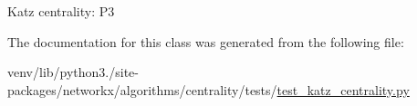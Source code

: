 \begin{DoxyVerb}Katz centrality: P3\end{DoxyVerb}
 

The documentation for this class was generated from the following file\+:\begin{DoxyCompactItemize}
\item 
venv/lib/python3./site-\/packages/networkx/algorithms/centrality/tests/\hyperlink{test__katz__centrality_8py}{test\+\_\+katz\+\_\+centrality.\+py}\end{DoxyCompactItemize}
